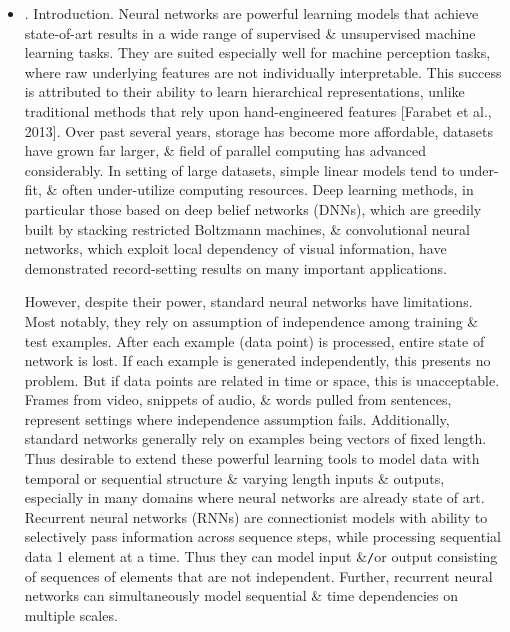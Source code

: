 \documentclass{article}
\begin{document}
\begin{enumerate}
\begin{itemize}
		\item {. Introduction.} Neural networks are powerful learning models that achieve state-of-art results in a wide range of supervised \& unsupervised machine learning tasks. They are suited especially well for machine perception tasks, where raw underlying features are not individually interpretable. This success is attributed to their ability to learn hierarchical representations, unlike traditional methods that rely upon hand-engineered features [Farabet et al., 2013]. Over past several years, storage has become more affordable, datasets have grown far larger, \& field of parallel computing has advanced considerably. In setting of large datasets, simple linear models tend to under-fit, \& often under-utilize computing resources. Deep learning methods, in particular those based on deep belief networks (DNNs), which are greedily built by stacking restricted Boltzmann machines, \& convolutional neural networks, which exploit local dependency of visual information, have demonstrated record-setting results on many important applications.
		
		However, despite their power, standard neural networks have limitations. Most notably, they rely on assumption of independence among training \& test examples. After each example (data point) is processed, entire state of network is lost. If each example is generated independently, this presents no problem. But if data points are related in time or space, this is unacceptable. Frames from video, snippets of audio, \& words pulled from sentences, represent settings where independence assumption fails. Additionally, standard networks generally rely on examples being vectors of fixed length. Thus desirable to extend these powerful learning tools to model data with temporal or sequential structure \& varying length inputs \& outputs, especially in many domains where neural networks are already state of art. Recurrent neural networks (RNNs) are connectionist models with ability to selectively pass information across sequence steps, while processing sequential data 1 element at a time. Thus they can model input \&{\tt/}or output consisting of sequences of elements that are not independent. Further, recurrent neural networks can simultaneously model sequential \& time dependencies on multiple scales.
		

\end{itemize}
\end{enumerate}
\end{document}
